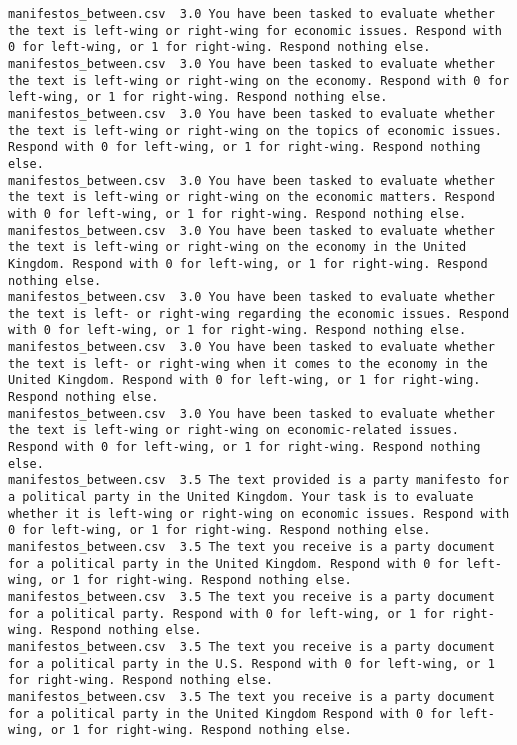 \begin{lstlisting}[label=lst:promptvariants]
manifestos_between.csv	3.0	You have been tasked to evaluate whether the text is left-wing or right-wing for economic issues. Respond with 0 for left-wing, or 1 for right-wing. Respond nothing else.
manifestos_between.csv	3.0	You have been tasked to evaluate whether the text is left-wing or right-wing on the economy. Respond with 0 for left-wing, or 1 for right-wing. Respond nothing else.
manifestos_between.csv	3.0	You have been tasked to evaluate whether the text is left-wing or right-wing on the topics of economic issues. Respond with 0 for left-wing, or 1 for right-wing. Respond nothing else.
manifestos_between.csv	3.0	You have been tasked to evaluate whether the text is left-wing or right-wing on the economic matters. Respond with 0 for left-wing, or 1 for right-wing. Respond nothing else.
manifestos_between.csv	3.0	You have been tasked to evaluate whether the text is left-wing or right-wing on the economy in the United Kingdom. Respond with 0 for left-wing, or 1 for right-wing. Respond nothing else.
manifestos_between.csv	3.0	You have been tasked to evaluate whether the text is left- or right-wing regarding the economic issues. Respond with 0 for left-wing, or 1 for right-wing. Respond nothing else.
manifestos_between.csv	3.0	You have been tasked to evaluate whether the text is left- or right-wing when it comes to the economy in the United Kingdom. Respond with 0 for left-wing, or 1 for right-wing. Respond nothing else.
manifestos_between.csv	3.0	You have been tasked to evaluate whether the text is left-wing or right-wing on economic-related issues. Respond with 0 for left-wing, or 1 for right-wing. Respond nothing else.
manifestos_between.csv	3.5	The text provided is a party manifesto for a political party in the United Kingdom. Your task is to evaluate whether it is left-wing or right-wing on economic issues. Respond with 0 for left-wing, or 1 for right-wing. Respond nothing else.
manifestos_between.csv	3.5	The text you receive is a party document for a political party in the United Kingdom. Respond with 0 for left-wing, or 1 for right-wing. Respond nothing else.
manifestos_between.csv	3.5	The text you receive is a party document for a political party. Respond with 0 for left-wing, or 1 for right-wing. Respond nothing else.
manifestos_between.csv	3.5	The text you receive is a party document for a political party in the U.S. Respond with 0 for left-wing, or 1 for right-wing. Respond nothing else.
manifestos_between.csv	3.5	The text you receive is a party document for a political party in the United Kingdom Respond with 0 for left-wing, or 1 for right-wing. Respond nothing else.

\end{lstlisting}
